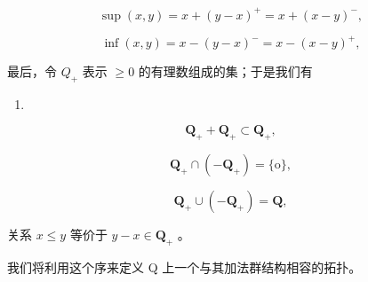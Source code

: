 \[
\sup (x, y) = x + (y - x) ^ {+} = x + (x - y) ^ {-},\tag{6}
\]

\[
\inf (x, y) = x - (y - x) ^ {-} = x - (x - y) ^ {+},\tag{7}
\]

最后，令 \(Q_{+}\) 表示 \(\geqslant0\) 的有理数组成的集；于是我们有

\begin{enumerate}
\def\labelenumi{(\arabic{enumi})}
\setcounter{enumi}{7}
\tightlist
\item
\end{enumerate}

\[
\mathbf {Q} _ {+} + \mathbf {Q} _ {+} \subset \mathbf {Q} _ {+},\tag{8}
\]

\[
\mathbf {Q} _ {+} \cap (- \mathbf {Q} _ {+}) = \{\mathrm{o} \},\tag{9}
\]

\[
\mathbf {Q} _ {+} \cup (- \mathbf {Q} _ {+}) = \mathbf {Q},\tag{10}
\]

关系 \(x \leqslant y\) 等价于 \(y - x \in \mathbf{Q}_{+}\) 。

我们将利用这个序来定义 Q 上一个与其加法群结构相容的拓扑。


